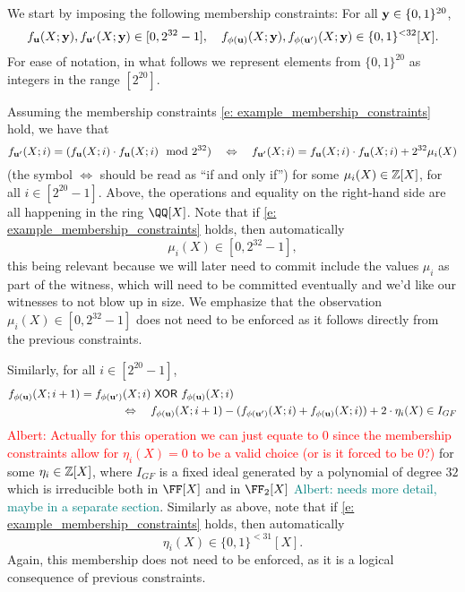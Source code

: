 \documentclass[11pt,letterpaper,usenames,dvipsnames]{article}
\newcommand{\albert}[1]{\textcolor{teal}{Albert: {#1}}}
\newcommand{\alberturgent}[1]{\textcolor{red}{Albert: {#1}}}
\begin{document}
We start by imposing the following membership constraints: For all $\mathbf{y}\in \{0,1\}^{20}$,
%
\begin{equation}\label{e: example_membership_constraints}
f_{\mathbf{u}}(X;\mathbf{y}), f_{\mathbf{u}'}(X;\mathbf{y}) \in [0,2^{32}-1], \quad f_{\phi(\mathbf{u})}(X;\mathbf{y}), f_{\phi(\mathbf{u}')}(X;\mathbf{y}) \in \{0,1\}^{<32}[X].
\end{equation}
%
For ease of notation, in what follows we represent elements from $\{0,1\}^{20}$ as integers in the range $[2^{20}]$. 

Assuming the membership constraints \eqref{e: example_membership_constraints} hold, we have that  
%
$$
f_{\mathbf{u}'}(X; i)= (f_{\mathbf{u}}(X;i)\cdot f_{\mathbf{u}}(X;i) \mod 2^{32}) \quad \Leftrightarrow  \quad f_{\mathbf{u}'}(X; i)= f_{\mathbf{u}}(X;i)\cdot f_{\mathbf{u}}(X;i) + 2^{32} \mu_i(X)
$$
(the symbol $\Leftrightarrow$ should be read as ``if and only if'')
for some $\mu_i(X)\in \mathbb{Z}[X]$, for all $i \in [2^{20}-1]$. Above, the operations and equality on the right-hand side  are all happening in the ring $\QQ[X]$.   Note that if \eqref{e: example_membership_constraints} holds, then automatically $$\mu_i(X) \in [0, 2^{32}-1],$$
this being relevant because we will later need to commit include the values $\mu_i$ as part of the witness, which will need to be committed eventually and we'd like our witnesses to not blow up in size. We emphasize that the observation $\mu_i(X) \in [0, 2^{32}-1]$  does not need to be enforced as it follows  directly from the previous constraints.


Similarly, for all $i\in [2^{20}-1]$,
%
\begin{align*}
&f_{\phi(\mathbf{u})}(X; i+1)= f_{\phi(\mathbf{u}')}(X;i)\ \mathsf{XOR}\  f_{\phi(\mathbf{u})}(X;i)\\ &\quad \quad \quad \quad \quad \quad \quad \quad \quad \quad \Leftrightarrow \quad  f_{\phi(\mathbf{u})}(X; i+1) - (f_{\phi(\mathbf{u}')}(X;i) + f_{\phi(\mathbf{u})}(X;i)) + 2\cdot \eta_i(X) \in I_{GF}
\end{align*}
\alberturgent{Actually for this operation we can just equate to $0$ since the membership constraints allow for $\eta_i(X)=0$ to be a valid choice (or is it forced to be $0$?) }for some $\eta_i \in \mathbb{Z}[X]$,  where $I_{GF}$ is a fixed ideal generated by  a polynomial of degree $32$ which is irreducible both in $\FF[X]$ and in $\FF_2[X]$ \albert{needs more detail, maybe in a separate section}. Similarly as above, note that if \eqref{e: example_membership_constraints} holds, then automatically $$\eta_i(X) \in \{0,1\}^{<31}[X].$$  Again, this membership does not need to be enforced, as it is a logical consequence of previous constraints.
\end{document}

